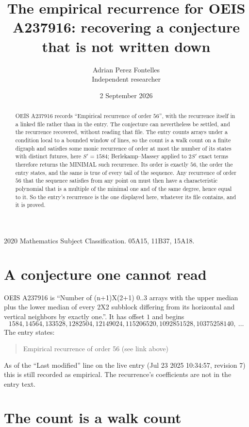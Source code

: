 \documentclass[11pt,a4paper]{article}
\title{The empirical recurrence for OEIS A237916: recovering a conjecture that is not written down}
\author{Adrian Perez Fontelles\\ \small Independent researcher}
\date{2 September 2026}
\theoremstyle{plain}
\theoremstyle{definition}
\begin{document}
\maketitle

\begin{abstract}
OEIS A237916 records ``Empirical recurrence of order $56$'', with the recurrence itself in a
linked file rather than in the entry. The conjecture can nevertheless be settled, and the
recurrence recovered, without reading that file. The entry counts arrays under a condition
local to a bounded window of lines, so the count is a walk count on a finite digraph and
satisfies some monic recurrence of order at most the number of its states with distinct
futures, here $S'=1584$; Berlekamp--Massey applied to $2S'$ exact
terms therefore returns the MINIMAL such recurrence. Its order is exactly $56$, the order
the entry states, and the same is true of every tail of the sequence. Any recurrence of order
$56$ that the sequence satisfies from any point on must then have a characteristic
polynomial that is a multiple of the minimal one and of the same degree, hence equal to it. So
the entry's recurrence is the one displayed here, whatever its file contains, and it is
proved.
\end{abstract}

\noindent\small 2020 Mathematics Subject Classification. 05A15, 11B37, 15A18.\normalsize

\section{A conjecture one cannot read}

OEIS A237916 is ``Number of (n+1)X(2+1) 0..3 arrays with the upper median plus the lower median of every 2X2 subblock differing from its horizontal and vertical neighbors by exactly one.''. It has offset $1$ and begins
\[
1584, 14564, 133528, 1282504, 12149024, 115206520, 1092851528, 10375258140,\ \dots
\]
The entry states:
\begin{quote}
Empirical recurrence of order 56 (see link above)
\end{quote}
As of the ``Last modified'' line on the live entry (Jul 23 2025 10:34:57, revision 7) this is still
recorded as empirical. The recurrence's coefficients are not in the entry text.

\section{The count is a walk count}
\end{document}
